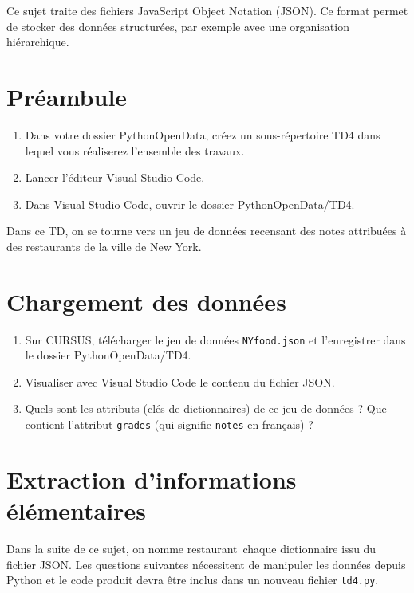 \documentclass[11pt,a4paper]{article}
\begin{document}
Ce sujet traite des fichiers JavaScript Object Notation (JSON).
Ce format permet de stocker des données structurées, par exemple avec une organisation hiérarchique.

\section*{Préambule}
\begin{enumerate}
    \item Dans votre dossier PythonOpenData, créez un sous-répertoire TD4 dans lequel vous réaliserez l'ensemble des travaux.
    \item Lancer l'éditeur Visual Studio Code.
    \item Dans Visual Studio Code, ouvrir le dossier PythonOpenData/TD4. 
\end{enumerate}

Dans ce TD, on se tourne vers un jeu de données recensant des notes attribuées à des restaurants de la ville de New York.

\section{Chargement des données}

\begin{enumerate}
    \item Sur CURSUS, télécharger le jeu de données \verb+NYfood.json+ et l'enregistrer dans le dossier PythonOpenData/TD4.
    \item Visualiser avec Visual Studio Code le contenu du fichier JSON.
    \item Quels sont les attributs (clés de dictionnaires) de ce jeu de données ? Que contient l'attribut \verb+grades+ (qui signifie \verb+notes+ en français) ?
\end{enumerate}

\section{Extraction d'informations élémentaires}

Dans la suite de ce sujet, on nomme \og restaurant\fg ~chaque dictionnaire issu du fichier JSON.
Les questions suivantes nécessitent de manipuler les données depuis Python et le code produit devra être inclus dans un nouveau fichier \verb+td4.py+.
\end{document}
